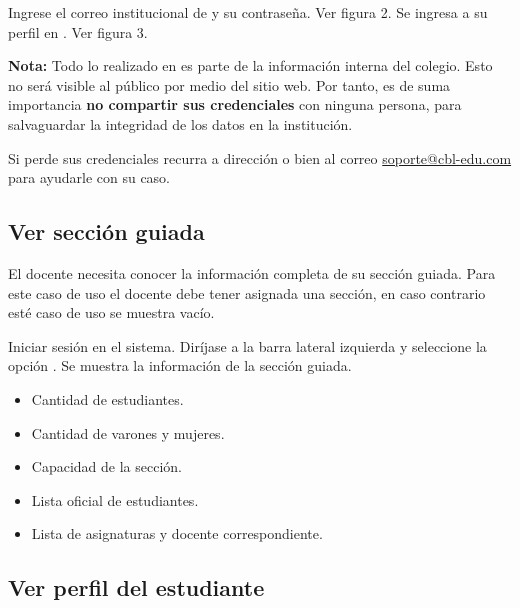 \documentclass[12pt]{article}
\begin{document}
     Ingrese el correo institucional de \cbl y su contraseña. Ver figura 2.
     Se ingresa a su perfil en \wsm. Ver figura 3.


    \textbf{Nota:} Todo lo realizado en \wsm es parte de la información interna del colegio.
    Esto no será visible al público por medio del sitio web.
    Por tanto, es de suma importancia \textbf{no compartir sus credenciales} con ninguna persona, para salvaguardar la
    integridad de los datos en la institución.

    Si perde sus credenciales recurra a dirección o bien al correo \href{mailto:soporte@cbl-edu.com}{soporte@cbl-edu.com}
    para ayudarle con su caso.

    \subsection{Ver sección guiada}

    El docente necesita conocer la información completa de su sección guiada.
    Para este caso de uso el docente debe tener asignada una sección, en caso contrario esté caso de uso se muestra vacío.

    \stepTitle
     Iniciar sesión en el sistema.
     Diríjase a la barra lateral izquierda y seleccione la opción .
     Se muestra la información de la sección guiada.
    \begin{itemize}
        \item Cantidad de estudiantes.
        \item Cantidad de varones y mujeres.
        \item Capacidad de la sección.
        \item Lista oficial de estudiantes.
        \item Lista de asignaturas y docente correspondiente.
    \end{itemize}



    \subsection{Ver perfil del estudiante}
\end{document}
